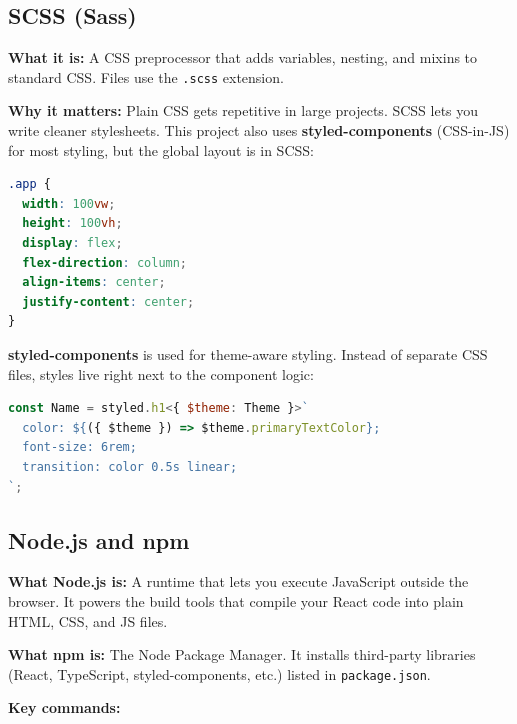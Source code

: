 \documentclass[11pt, letterpaper]{article}
\begin{document}
\subsection{SCSS (Sass)}

\textbf{What it is:} A CSS preprocessor that adds variables, nesting, and
mixins to standard CSS. Files use the \texttt{.scss} extension.

\textbf{Why it matters:} Plain CSS gets repetitive in large projects. SCSS
lets you write cleaner stylesheets. This project also uses
\textbf{styled-components} (CSS-in-JS) for most styling, but the global
layout is in SCSS:

\begin{lstlisting}[style=code, language=CSS, caption={src/App/App.scss --- Global layout}]
.app {
  width: 100vw;
  height: 100vh;
  display: flex;
  flex-direction: column;
  align-items: center;
  justify-content: center;
}
\end{lstlisting}

\textbf{styled-components} is used for theme-aware styling. Instead of
separate CSS files, styles live right next to the component logic:

\begin{lstlisting}[style=code, language=JavaScript, caption={Theme-aware styled component}]
const Name = styled.h1<{ $theme: Theme }>`
  color: ${({ $theme }) => $theme.primaryTextColor};
  font-size: 6rem;
  transition: color 0.5s linear;
`;
\end{lstlisting}

\subsection{Node.js and npm}

\textbf{What Node.js is:} A runtime that lets you execute JavaScript outside
the browser. It powers the build tools that compile your React code into plain
HTML, CSS, and JS files.

\textbf{What npm is:} The Node Package Manager. It installs third-party
libraries (React, TypeScript, styled-components, etc.) listed in
\texttt{package.json}.

\textbf{Key commands:}
\end{document}
